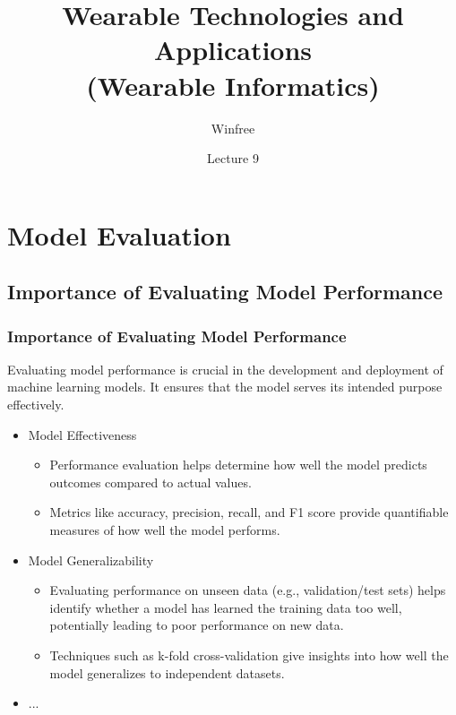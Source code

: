 \documentclass[aspectratio=169]{beamer} %
\title[INF632 (EE499/EE599)]{Wearable Technologies and Applications\\(Wearable Informatics)} %
\author{Winfree}
\date{Lecture 9}
\begin{document}
	\maketitle



\section{Model Evaluation}
	\subsection{Importance of Evaluating Model Performance}
	\begin{frame}
		\frametitle{Importance of Evaluating Model Performance}
		Evaluating model performance is crucial in the development and deployment of machine learning models. It ensures that the model serves its intended purpose effectively.
		\begin{itemize}
			\item Model Effectiveness
			\begin{itemize}
				\item Performance evaluation helps determine how well the model predicts outcomes compared to actual values.
				\item Metrics like accuracy, precision, recall, and F1 score provide quantifiable measures of how well the model performs.
			\end{itemize}
			\item Model Generalizability
			\begin{itemize}
				\item Evaluating performance on unseen data (e.g., validation/test sets) helps identify whether a model has learned the training data too well, potentially leading to poor performance on new data.
				\item Techniques such as k-fold cross-validation give insights into how well the model generalizes to independent datasets.
			\end{itemize}
			\item ...
		\end{itemize}
	\end{frame}
\end{document}
